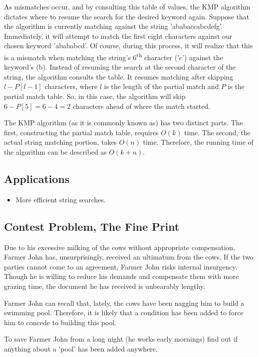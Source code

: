 As mismatches occur, and by consulting this table of values, the KMP algorithm dictates where to resume the search for the desired keyword again.
Suppose that the algorithm is currently matching against the string 'ababaccabcdefg'.
Immediately, it will attempt to match the first eight characters against our chosen keyword 'abababcd'.
Of course, during this process, it will realize that this is a mismatch when matching the string's 6\textsuperscript{th} character ('c') against the keyword's (b).
Instead of resuming the search at the second character of the string, the algorithm consults the table.
It resumes matching after skipping $l - P[l - 1]$ characters, where $l$ is the length of the partial match and $P$ is the partial match table.
So, in this case, the algorithm will skip $6 - P[5] = 6 - 4 = 2$ characters ahead of where the match started.

The KMP algorithm (as it is commonly known as) has two distinct parts.
The first, constructing the partial match table, requires $O(k)$ time.
The second, the actual string matching portion, takes $O(n)$ time.
Therefore, the running time of the algorithm can be described as $O(k + n)$.

\subsection{Applications}
\begin{itemize}
	\item More efficient string searches.
\end{itemize}

\subsection{Contest Problem, The Fine Print}
Due to his excessive milking of the cows without appropriate compensation, Farmer John has, unsurprisingly, received an ultimatum from the cows.
If the two parties cannot come to an agreement, Farmer John risks internal insurgency.
Though he is willing to reduce his demands and compensate them with more grazing time, the document he has received is unbearably lengthy.

Farmer John can recall that, lately, the cows have been nagging him to build a swimming pool.
Therefore, it is likely that a condition has been added to force him to concede to building this pool.

To save Farmer John from a long night (he works early mornings) find out if anything about a 'pool' has been added anywhere.

